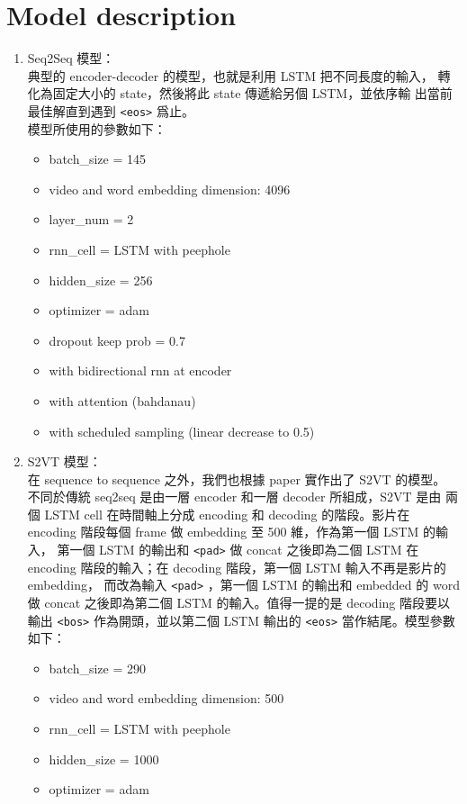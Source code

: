 \documentclass[12pt, a4paper]{article}
\theoremstyle{mystyle}	%
\begin{document}
\section{Model description}
\begin{enumerate}
\item Seq2Seq 模型：\\
典型的 encoder-decoder 的模型，也就是利用 LSTM 把不同長度的輸入，
轉化為固定大小的 state，然後將此 state 傳遞給另個 LSTM，並依序輸
出當前最佳解直到遇到 \texttt{<eos>} 爲止。\\
模型所使用的參數如下：
\begin{itemize}
  \item batch\_size = 145
  \item video and word embedding dimension: 4096
  \item layer\_num = 2
  \item rnn\_cell = LSTM with peephole
  \item hidden\_size = 256
  \item optimizer = adam
  \item dropout keep prob = 0.7
  \item with bidirectional rnn at encoder
  \item with attention (bahdanau)
  \item with scheduled sampling (linear decrease to 0.5)
\end{itemize}
\item S2VT 模型：\\
在 sequence to sequence 之外，我們也根據 paper 實作出了 S2VT 的模型。
不同於傳統 seq2seq 是由一層 encoder 和一層 decoder 所組成，S2VT 是由
兩個 LSTM cell 在時間軸上分成 encoding 和 decoding 的階段。影片在
encoding 階段每個 frame 做 embedding 至 500 維，作為第一個 LSTM 的輸入，
第一個 LSTM 的輸出和 \texttt{<pad>} 做 concat 之後即為二個 LSTM 在 encoding
階段的輸入；在 decoding 階段，第一個 LSTM 輸入不再是影片的 embedding，
而改為輸入 \texttt{<pad>} ，第一個 LSTM 的輸出和 embedded 的 word 做 concat
之後即為第二個 LSTM 的輸入。值得一提的是 decoding 階段要以輸出 \texttt{<bos>}
作為開頭，並以第二個 LSTM 輸出的 \texttt{<eos>} 當作結尾。模型參數如下：
\begin{itemize}
  \item batch\_size = 290
  \item video and word embedding dimension: 500
  \item rnn\_cell = LSTM with peephole
  \item hidden\_size = 1000
  \item optimizer = adam

\end{itemize}
\end{enumerate}
\end{document}
